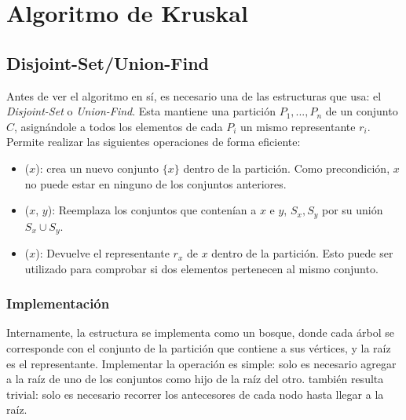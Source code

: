 \documentclass[a4paper]{report}
\begin{document}
\section{Algoritmo de Kruskal}

\subsection{Disjoint-Set/Union-Find}

Antes de ver el algoritmo en sí, es necesario una de las estructuras que usa: el \textit{Disjoint-Set} o \textit{Union-Find}. Esta mantiene una partición $P_1, ..., P_n$ de un conjunto $C$, asignándole a todos los elementos de cada $P_i$ un mismo representante $r_i$. Permite realizar las siguientes operaciones de forma eficiente:
\begin{itemize}
    \item {}($x$): crea un nuevo conjunto $\{x\}$ dentro de la partición. Como precondición, $x$ no puede estar en ninguno de los conjuntos anteriores.
    \item {}($x$, $y$): Reemplaza los conjuntos que contenían a $x$ e $y$, $S_x, S_y$ por su unión $S_x \cup S_y$.
    \item {}($x$): Devuelve el representante $r_x$ de $x$ dentro de la partición. Esto puede ser utilizado para comprobar si dos elementos pertenecen al mismo conjunto.
\end{itemize}

\subsubsection{Implementación}

Internamente, la estructura se implementa como un bosque, donde cada árbol se corresponde con el conjunto de la partición que contiene a sus vértices, y la raíz es el representante. Implementar la operación  es simple: solo es necesario agregar a la raíz de uno de los conjuntos como hijo de la raíz del otro.  también resulta trivial: solo es necesario recorrer los antecesores de cada nodo hasta llegar a la raíz.
\end{document}
